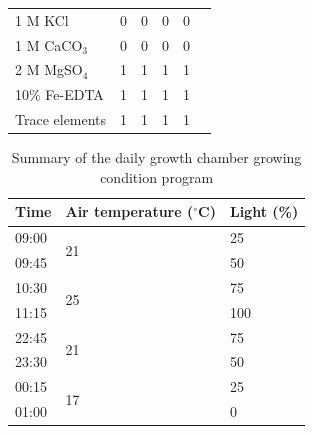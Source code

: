 \begin{table}[!h]
{\begin{tabular}{p{4cm}p{2cm}p{2cm}p{2cm}p{2cm}p{2cm}}
        1 M KCl                 & \multicolumn{1}{r}{0}         & \multicolumn{1}{r}{0}         & \multicolumn{1}{r}{0}         & \multicolumn{1}{r}{0}         &   \\
        1 M CaCO$_3$            & \multicolumn{1}{r}{0}         & \multicolumn{1}{r}{0}         & \multicolumn{1}{r}{0}         & \multicolumn{1}{r}{0}         &   \\
        2 M MgSO$_4$            & \multicolumn{1}{r}{1}         & \multicolumn{1}{r}{1}         & \multicolumn{1}{r}{1}         & \multicolumn{1}{r}{1}         &   \\
        10\% Fe-EDTA            & \multicolumn{1}{r}{1}         & \multicolumn{1}{r}{1}         & \multicolumn{1}{r}{1}         & \multicolumn{1}{r}{1}         &   \\
        Trace elements          & \multicolumn{1}{r}{1}         & \multicolumn{1}{r}{1}         & \multicolumn{1}{r}{1}         & \multicolumn{1}{r}{1}         &   \\
        \hline
\end{tabular}}
\end{table}
\clearpage

\newpage
\begin{table}[]
    \centering
    \caption{Summary of the daily growth chamber growing condition program}
    \label{table:tab.d2}
    \begin{tabular}{|p{2cm}|p{4.5cm}|p{2cm}|}
        \hline
        Time  & Air temperature ($^{\circ}$C)   & Light (\%) \\
        \hline
        09:00 & \multirow{2}{*}{21}             & 25         \\
        09:45 &                                 & 50         \\
        \hline
        10:30 & \multirow{2}{*}{25}             & 75         \\
        11:15 &                                 & 100        \\
        \hline
        22:45 & \multirow{2}{*}{21}             & 75         \\
        23:30 &                                 & 50         \\
        \hline
        00:15 & \multirow{2}{*}{17}             & 25         \\
        01:00 &                                 & 0          \\
        \hline      
    \end{tabular}%
\end{table}
\clearpage

